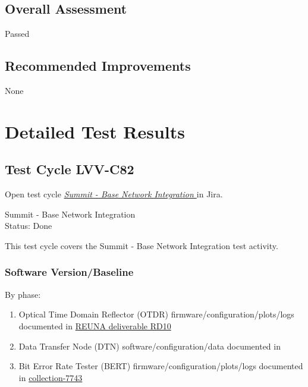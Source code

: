 \documentclass[DM,STR,toc]{lsstdoc}
\providecommand{\tightlist}{
  \setlength{\itemsep}{0pt}\setlength{\parskip}{0pt}}
\begin{document}
\subsection{Overall Assessment}
\label{sect:overallassessment}

Passed


\subsection{Recommended Improvements}
\label{sect:recommendations}

None


\newpage
\section{Detailed Test Results}
\label{sect:detailedtestresults}


  \subsection{Test Cycle LVV-C82 }

Open test cycle {\it \href{https://jira.lsstcorp.org/secure/Tests.jspa#/testrun/LVV-C82}{Summit - Base Network Integration
}} in Jira.

  Summit - Base Network Integration
\\
  Status: Done

  This test cycle covers the Summit - Base Network Integration test
activity.


  \subsubsection{Software Version/Baseline}
    By phase:\\

\begin{enumerate}
\tightlist
\item
  Optical Time Domain Reflector (OTDR) firmware/configuration/plots/logs
  documented in
  \href{https://docushare.lsstcorp.org/docushare/dsweb/Get/Document-26270/RD10\%20Report\%20of\%20delivery\%20of\%20LS\%20-\%20AG\%20fiber\%20from\%20Telefonica\%20to\%20REUNA.pdf}{REUNA
  deliverable RD10}
\item
  Data Transfer Node (DTN) software/configuration/data documented in
\item
  Bit Error Rate Tester (BERT) firmware/configuration/plots/logs
  documented in
  \href{https://docushare.lsstcorp.org/docushare/dsweb/View/Collection-7743}{collection-7743}
\end{enumerate}
\end{document}
